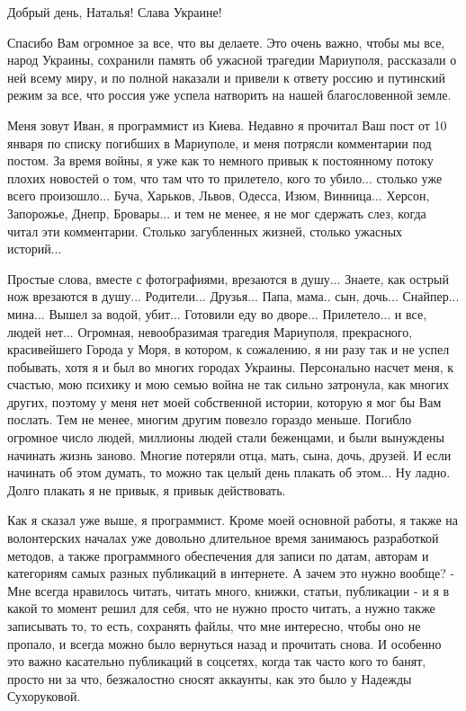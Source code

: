  
 
 
 
 

Добрый день, Наталья! Слава Украине!

Спасибо Вам огромное за все, что вы делаете. Это очень важно, чтобы мы все,
народ Украины, сохранили память об ужасной трагедии Мариуполя, рассказали о ней
всему миру, и по полной наказали и привели к ответу россию и путинский режим за
все, что россия уже успела натворить на нашей благословенной земле.

Меня зовут Иван, я программист из Киева.  Недавно я прочитал Ваш пост от 10
января по списку погибших в Мариуполе, и меня потрясли комментарии под постом.
За время войны, я уже как то немного привык к постоянному потоку плохих
новостей о том, что там что то прилетело, кого то убило... столько уже всего
произошло... Буча, Харьков, Львов, Одесса, Изюм, Винница... Херсон, Запорожье,
Днепр, Бровары... и тем не менее, я не мог сдержать слез, когда читал эти
комментарии.  Столько загубленных жизней, столько ужасных историй...

Простые слова, вместе с фотографиями, врезаются в душу...  Знаете, как острый
нож врезаются в душу...  Родители...  Друзья... Папа, мама.. сын, дочь...
Снайпер... мина...  Вышел за водой, убит...  Готовили еду во дворе...
Прилетело... и все, людей нет...  Огромная, невообразимая трагедия Мариуполя,
прекрасного, красивейшего Города у Моря, в котором, к сожалению, я ни разу так
и не успел побывать, хотя я и был во многих городах Украины. Персонально насчет
меня, к счастью, мою психику и мою семью война не так сильно затронула, как
многих других, поэтому у меня нет моей собственной истории, которую я мог бы
Вам послать. Тем не менее, многим другим повезло гораздо меньше. Погибло
огромное число людей, миллионы людей стали беженцами, и были вынуждены начинать
жизнь заново. Многие потеряли отца, мать, сына, дочь, друзей. И если начинать об
этом думать, то можно так целый день плакать об этом... Ну ладно. Долго плакать
я не привык, я привык действовать.

Как я сказал уже выше, я программист. Кроме моей основной работы, я также на
волонтерских началах уже довольно длительное время занимаюсь разработкой
методов, а также программного обеспечения для записи по датам, авторам и
категориям самых разных публикаций в интернете. А зачем это нужно вообще? - Мне
всегда нравилось читать, читать много, книжки, статьи, публикации - и я в какой
то момент решил для себя, что не нужно просто читать, а нужно также записывать
то, то есть, сохранять файлы, что мне интересно, чтобы оно не пропало, и всегда
можно было вернуться назад и прочитать снова. И особенно это важно касательно
публикаций в соцсетях, когда так часто кого то банят, просто ни за что,
безжалостно сносят аккаунты, как это было у Надежды Сухоруковой.

